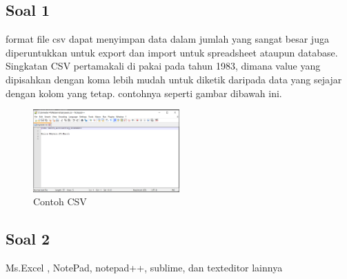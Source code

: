 	\subsection{Soal 1}
	format file csv dapat menyimpan data dalam jumlah yang sangat besar juga diperuntukkan untuk export dan import untuk spreadsheet ataupun database. Singkatan CSV pertamakali di pakai pada tahun 1983, dimana value yang dipisahkan dengan koma lebih mudah untuk diketik daripada data yang sejajar dengan kolom yang tetap. contohnya seperti gambar dibawah ini.

	\begin{figure}[ht]
            \centerline{\includegraphics[width=0.5\textwidth]{figures/4/1174040/Teori/1174040_csv.png}}
            \caption{Contoh CSV}
            \label{1174040_csv}
            \end{figure}

    \subsection{Soal 2}
    Ms.Excel , NotePad, notepad++, sublime, dan texteditor lainnya

